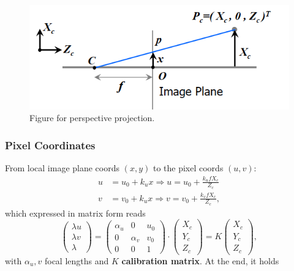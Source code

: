 \documentclass[a4paper,12 pt]{article}
\theoremstyle{definition}
\theoremstyle{remark}
\theoremstyle{definition}
\theoremstyle{definition}
\theoremstyle{definition}
\theoremstyle{remark}
\theoremstyle{definition}
\begin{document}
\begin{figure}[h!]
\begin{center}
\includegraphics[scale=0.5]{pics/proj}
\caption{Figure for perspective projection. \label{fig:proj}}
\end{center}
\end{figure}
\subsubsection*{Pixel Coordinates}
From local image plane coords $(x,y)$ to the pixel coords $(u,v)$:
\begin{equation}
\begin{split}
u&=u_0+k_ux \Rightarrow u=u_0+\frac{k_ufX_c}{Z_c}\\
v&=v_0+k_ux \Rightarrow v=v_0+\frac{k_vfX_c}{Z_c},
\end{split}
\end{equation}
which expressed in matrix form reads
\begin{equation}
\begin{pmatrix}
\lambda u\\
\lambda v\\
\lambda 
\end{pmatrix}=\begin{pmatrix}
\alpha _u&0&u_0\\
0&\alpha_v &v_0 \\
0&0&1
\end{pmatrix}\cdot \begin{pmatrix}
X_c\\
Y_c\\
Z_c
\end{pmatrix}=K\begin{pmatrix}
X_c\\
Y_c\\
Z_c
\end{pmatrix},
\end{equation}
with $\alpha _u,v$ focal lengths and $K$ \textbf{calibration matrix}. At the end, it holds
\end{document}
